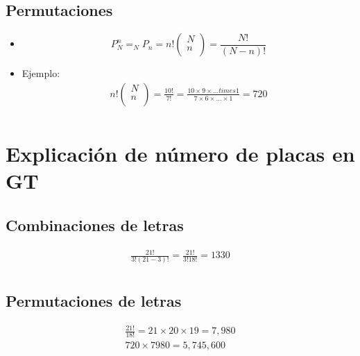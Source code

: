 \subsection{Permutaciones}
\begin{itemize}
    \item \[
        P_N^n = _NP_n = n!\left( \begin{matrix}
            N \\ 
            n \\ 
        \end{matrix} \right) = \frac{N!}{(N-n)!} 
      \]
    
    \item Ejemplo:
        \begin{align*}
            n! \left(\begin{matrix}
                N \\ n \\ 
            \end{matrix}\right) = \frac{10!}{7!}  = \frac{10 \times 9 \times ... times 1}{7 \times 6 \times  ...  \times 1} = 720 \\  
        \end{align*}
\end{itemize}



\section{Explicación de número de placas en GT }
\subsection{Combinaciones de letras}
\begin{align*}
    \frac{21!}{3!(21-3)!} = \frac{21!}{3!18!} = 1330 \\  
\end{align*}

\subsection{Permutaciones de letras}
\begin{align*}
    \frac{21!}{18!} = 21 \times 20 \times 19 = 7,980 \\ 
    720 \times 7980 = 5,745,600 \\ 
\end{align*}


